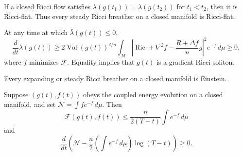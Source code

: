 \begin{lemma}
\label{lem:chow-ii-appd-no-steady-breathers}


If a closed Ricci flow satisfies $\lambda(g(t_1))=\lambda(g(t_2))$ for
$t_1<t_2$, then it is Ricci-flat. Thus every steady Ricci breather on a
closed manifold is Ricci-flat.
\end{lemma}

\begin{lemma}
\label{lem:chow-ii-appd-normalized-lambda-monotonicity}


At any time at which $\bar\lambda(g(t))\leq0$,
\[
 \frac d{dt}\bar\lambda(g(t))\geq
 2\operatorname{Vol}(g(t))^{2/n}\int_{\mathcal M}
 \left|\operatorname{Ric}+\nabla^2f-
 \frac{R+\Delta f}{n}g\right|^2e^{-f}\,d\mu\geq0,
\]
where $f$ minimizes $\mathcal F$. Equality implies that $g(t)$ is a gradient
Ricci soliton.
\end{lemma}

\begin{lemma}
\label{lem:chow-ii-appd-no-expanding-breathers}


Every expanding or steady Ricci breather on a closed manifold is Einstein.
\end{lemma}

\begin{lemma}
\label{lem:chow-ii-appd-classical-entropy-monotonicity}


Suppose $(g(t),f(t))$ obeys the coupled energy evolution on a closed manifold,
and set $\mathcal N=\int f e^{-f}\,d\mu$. Then
\[
 \mathcal F(g(t),f(t))\leq\frac n{2(T-t)}\int e^{-f}\,d\mu
\]
and
\[
 \frac d{dt}\left(\mathcal N-
 \frac n2\left(\int e^{-f}\,d\mu\right)\log(T-t)\right)\geq0.
\]
\end{lemma}

